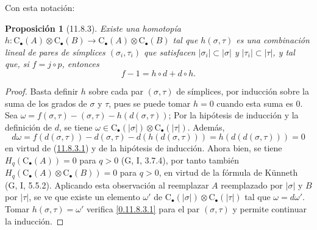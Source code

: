 \documentclass[10pt,oneside,openany]{book}
\theoremstyle{egaenv}\newtheorem*{env}{---}
\theoremstyle{egastatement}
\newtheorem*{proposition}{Proposición}
\theoremstyle{egadescription}
\newcommand{\oldpage}[2][]{\marginnote{\normalfont\scriptsize\textbf{#1}\,|\,#2}\ignorespaces}
\begin{document}
\oldpage[0\textsubscript{III}]{44}
Con esta notación:
\begin{proposition}[11.8.3]
\label{0.11.8.3}
\label{0.11.8.3-fr}
Existe una homotopía
$h:\mathrm C_\bullet(A)\otimes\mathrm C_\bullet(B)\longrightarrow\mathrm C_\bullet(A)\otimes\mathrm C_\bullet(B)$
tal que $h(\sigma,\tau)$ es una combinación lineal de pares de símplices
$(\sigma_i,\tau_i)$ que satisfacen
$|\sigma_i|\subset|\sigma|$ y $|\tau_i|\subset|\tau|$, y tal que,
si $f=j\circ p$, entonces
\[
\label{0.11.8.3.1-fr}
\tag{11.8.3.1}
f-1=h\circ d+d\circ h.
\]
\end{proposition}

\begin{proof}
Basta definir $h$ sobre cada par $(\sigma,\tau)$ de símplices, por
inducción sobre la suma de los grados de $\sigma$ y $\tau$, pues se puede tomar $h=0$ cuando esta suma es $0$. Sea
$\omega=f(\sigma,\tau)-(\sigma,\tau)-h(d(\sigma,\tau))$;
Por la hipótesis de inducción y la definición de $d$, se tiene
$\omega\in\mathrm C_\bullet(|\sigma|)\otimes\mathrm C_\bullet(|\tau|)$.
Además,
\[
d\omega=f(d(\sigma,\tau))-d(\sigma,\tau)-d(h(d(\sigma,\tau)))
=h(d(d(\sigma,\tau)))=0
\]
en virtud de (\hyperref[0.11.8.3.1-fr]{11.8.3.1}) y de la hipótesis de inducción. Ahora bien, se tiene $H_q(\mathrm C_\bullet(A))=0$ para $q>0$ (G, I, 3.7.4), por tanto también $H_q(\mathrm C_\bullet(A)\otimes\mathrm C_\bullet(B))=0$ para $q>0$, en virtud de la fórmula de Künneth (G, I, 5.5.2). Aplicando esta observación al reemplazar $A$ reemplazado por $|\sigma|$ y $B$ por
$|\tau|$, se ve que existe un elemento $\omega'$ de $\mathrm C_\bullet(|\sigma|)\otimes\mathrm C_\bullet(|\tau|)$ tal que $\omega=d\omega'$.
Tomar $h(\sigma,\tau)=\omega'$ verifica \eqref{0.11.8.3.1} para el par
$(\sigma,\tau)$ y permite continuar la inducción.
\end{proof}
\end{document}
